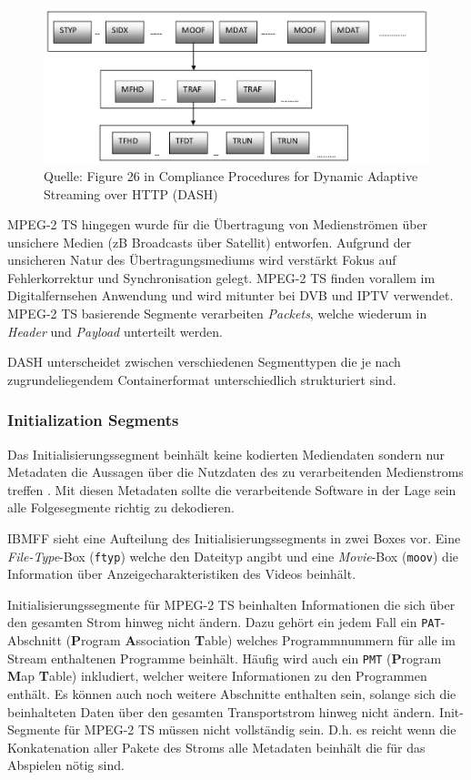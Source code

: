 \documentclass[paper = a4, fontsize = 12pt, parskip = half]{scrartcl} %
\def\attr#1{\texttt{#1}}
\begin{document}
\begin{figure}[h]
	\centering
	\includegraphics[width=12cm]{images/isobmff_boxes.png}
	\caption{Quelle: Figure 26 in Compliance Procedures for Dynamic Adaptive Streaming over HTTP (DASH)}
	\label{ibmff_boxes}
\end{figure}

MPEG-2 TS hingegen wurde für die Übertragung von Medienströmen über unsichere Medien (zB Broadcasts über Satellit) entworfen. Aufgrund der unsicheren Natur des Übertragungsmediums wird verstärkt Fokus auf Fehlerkorrektur und Synchronisation gelegt. MPEG-2 TS finden vorallem im Digitalfernsehen Anwendung und wird mitunter bei DVB und IPTV verwendet. MPEG-2 TS basierende Segmente verarbeiten \textit{Packets}, welche wiederum in \textit{Header} und \textit{Payload} unterteilt werden.

DASH unterscheidet zwischen verschiedenen Segmenttypen die je nach zugrundeliegendem Containerformat unterschiedlich strukturiert sind.

\subsubsection{Initialization Segments}
Das Initialisierungssegment beinhält keine kodierten Mediendaten sondern nur Metadaten die Aussagen über die Nutzdaten des zu verarbeitenden Medienstroms treffen \cite{international_organization_for_standardization_isoiec_nodate}. Mit diesen Metadaten sollte die verarbeitende Software in der Lage sein alle Folgesegmente richtig zu dekodieren.

IBMFF sieht eine Aufteilung des Initialisierungssegments in zwei Boxes vor. Eine \textit{File-Type}-Box (\attr{ftyp}) welche den Dateityp angibt und eine \textit{Movie}-Box (\attr{moov}) die Information über Anzeigecharakteristiken des Videos beinhält.

Initialisierungssegmente für MPEG-2 TS beinhalten Informationen die sich über den gesamten Strom hinweg nicht ändern. Dazu gehört ein jedem Fall ein \attr{PAT}-Abschnitt (\textbf{P}rogram \textbf{A}ssociation \textbf{T}able) welches Programmnummern für alle im Stream enthaltenen Programme beinhält. Häufig wird auch ein \attr{PMT} (\textbf{P}rogram \textbf{M}ap \textbf{T}able) inkludiert, welcher weitere Informationen zu den Programmen enthält. Es können auch noch weitere Abschnitte enthalten sein, solange sich die beinhalteten Daten über den gesamten Transportstrom hinweg nicht ändern.
Init-Segmente für MPEG-2 TS müssen nicht vollständig sein. D.h. es reicht wenn die Konkatenation aller Pakete des Stroms alle Metadaten beinhält die für das Abspielen nötig sind.
\end{document}
